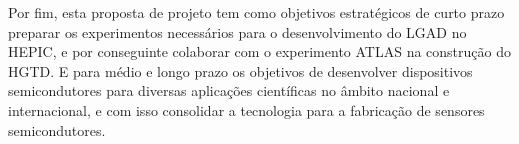 
Por fim, esta proposta de projeto tem como objetivos estratégicos de curto prazo preparar os experimentos necessários para o desenvolvimento do LGAD no HEPIC, e por conseguinte colaborar com o experimento ATLAS na construção do HGTD. E para médio e longo prazo os objetivos de desenvolver dispositivos semicondutores para diversas aplicações científicas no âmbito nacional e internacional, e com isso consolidar a tecnologia para a fabricação de sensores semicondutores.














